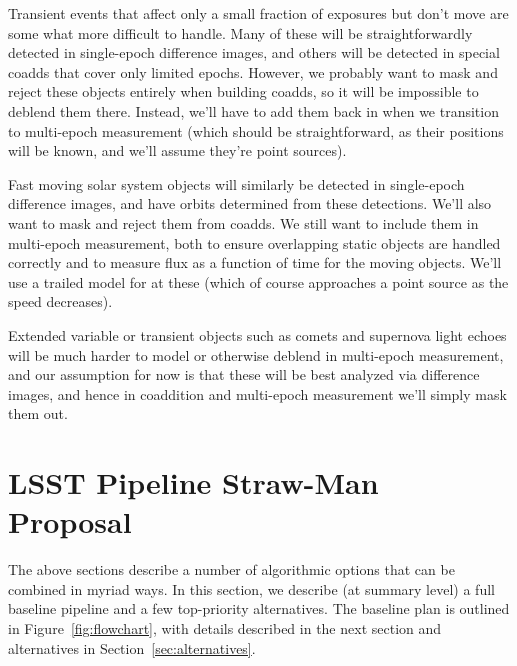 \documentclass[10pt]{article}
\begin{document}
Transient events that affect only a small fraction of exposures but don't move
are some what more difficult to handle.  Many of these will be
straightforwardly detected in single-epoch difference images, and others will
be detected in special coadds that cover only limited epochs.  However, we
probably want to mask and reject these objects entirely when building coadds,
so it will be impossible to deblend them there.  Instead, we'll have to add
them back in when we transition to multi-epoch measurement (which should be
straightforward, as their positions will be known, and we'll assume they're
point sources).

Fast moving solar system objects will similarly be detected in single-epoch
difference images, and have orbits determined from these detections.  We'll
also want to mask and reject them from coadds.  We still want to
include them in multi-epoch measurement, both to ensure overlapping static
objects are handled correctly and to measure flux as a function of time for
the moving objects.  We'll use a trailed model for at these (which of course
approaches a point source as the speed decreases).

Extended variable or transient objects such as comets and supernova light
echoes will be much harder to model or otherwise deblend in multi-epoch
measurement, and our assumption for now is that these will be best analyzed
via difference images, and hence in coaddition and multi-epoch measurement
we'll simply mask them out.

\section{LSST Pipeline Straw-Man Proposal}

The above sections describe a number of algorithmic options that can be
combined in myriad ways.  In this section, we describe (at summary level) a
full baseline pipeline and a few top-priority alternatives. The baseline plan
is outlined in Figure~\ref{fig:flowchart}, with details described in the next
section and alternatives in Section~\ref{sec:alternatives}.
\end{document}
